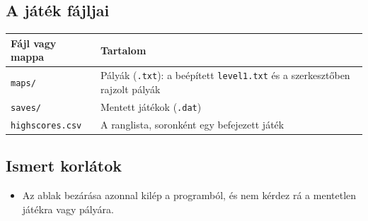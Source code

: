 \documentclass[11pt, a4paper]{article}
\begin{document}
\subsection*{A játék fájljai}
\begin{tabular}{@{}ll@{}}
    \toprule
    \textbf{Fájl vagy mappa} & \textbf{Tartalom} \\
    \midrule
    \texttt{maps/} & Pályák (\texttt{.txt}): a beépített \texttt{level1.txt} és a szerkesztőben rajzolt pályák \\
    \texttt{saves/} & Mentett játékok (\texttt{.dat}) \\
    \texttt{highscores.csv} & A ranglista, soronként egy befejezett játék \\
    \bottomrule
\end{tabular}

\subsection*{Ismert korlátok}
\begin{itemize}
    \item Az ablak bezárása azonnal kilép a programból, és nem kérdez rá a mentetlen játékra vagy pályára.
\end{itemize}
\end{document}
